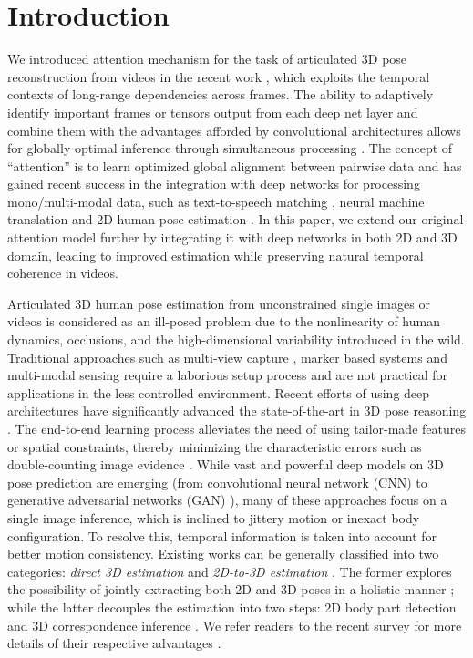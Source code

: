 \documentclass[twocolumn]{svjour3}          \smartqed  \usepackage{graphicx}
\begin{document}
\section{Introduction}
We introduced attention mechanism for the task of articulated 3D pose reconstruction from videos in the recent work \citep{liu2020attention}, which exploits the temporal contexts of long-range dependencies across frames. The ability to adaptively identify important frames or tensors output from each deep net layer and combine them with the advantages afforded by convolutional architectures allows for globally optimal inference through simultaneous processing .  The concept of ``attention'' is to learn optimized global alignment between pairwise data and has gained recent success in the integration with deep networks for processing mono/multi-modal data, such as text-to-speech matching \citep{Chorowski2015}, neural machine translation \citep{Bahdanau2015} and 2D human pose estimation \citep{chu2017multi}.  In this paper, we extend our original attention model further by integrating it with deep networks in both 2D and 3D domain, leading to improved estimation while preserving natural temporal coherence in videos.

Articulated 3D human pose estimation from unconstrained single images or videos is considered as an ill-posed problem due to the nonlinearity of human dynamics, occlusions, and the high-dimensional variability introduced in the wild. Traditional approaches such as multi-view capture \citep{Amin13}, marker based systems  \citep{Mandery2015} and multi-modal sensing \citep{Palmero2016} require a laborious setup process and are not practical for applications in the less controlled environment.  Recent efforts of using deep architectures have significantly advanced the state-of-the-art in 3D pose reasoning \citep{Toshev2014, Neverova2014}.  The end-to-end learning process alleviates the need of using tailor-made features or spatial constraints, thereby minimizing the characteristic errors such as double-counting image evidence \citep{Ferrari2009}. 
  While vast and powerful deep models on 3D pose prediction are emerging (from convolutional neural network (CNN) \citep{Pavlakos2017, Tekin2016, Li2015} to generative adversarial networks (GAN) \citep{Yang2018,  Chen2019}), many of these approaches focus on a single image inference, which is inclined to jittery motion or inexact body configuration. To resolve this, temporal information is taken into account for better motion consistency. Existing works can be generally classified into two categories: \emph{direct 3D estimation} and \emph{2D-to-3D estimation} \citep{Zhou2016, Chen2016}. The former explores the possibility of jointly extracting both 2D and 3D poses in a holistic manner \citep{Pavlakos2017, Varol2017}; while the latter decouples the estimation into two steps: 2D body part detection and 3D correspondence inference \citep{Chen2017, Bogo2016, Zhou2016}. We refer readers to the recent survey for more details of their respective advantages \citep{Martinez2017}. 
\end{document}
